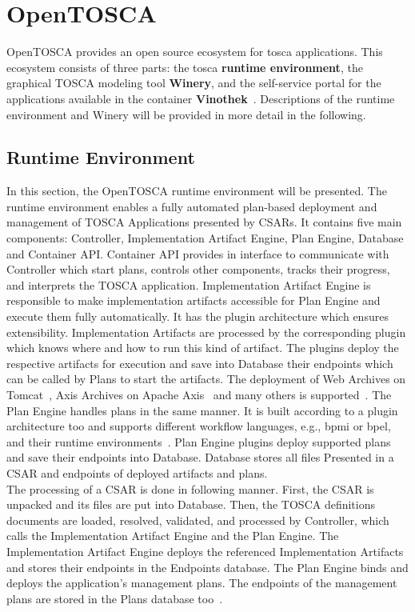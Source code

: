 \section{OpenTOSCA} \label{sec:opentosca}
OpenTOSCA provides an open source ecosystem for \gls{tosca} applications. 
This ecosystem consists of three parts: the \gls{tosca} \textbf{runtime environment}, the graphical TOSCA modeling tool \textbf{Winery}, and the self-service portal for the applications available in the container \textbf{Vinothek}~\cite*{OpenTOSCA}.
Descriptions of the runtime environment and Winery will be provided in more detail in the following. 
\subsection*{Runtime Environment}
In this section, the OpenTOSCA runtime environment will be presented.
The runtime environment enables a fully automated plan-based deployment and management of TOSCA Applications presented by CSARs. 
It contains five main components: Controller, Implementation Artifact Engine, Plan Engine, Database and Container API.
Container API provides in interface to communicate with Controller which  start plans, controls other components, tracks their progress, and interprets the TOSCA application.
Implementation Artifact Engine is responsible to make implementation artifacts accessible for Plan Engine and execute them fully automatically.
It has the plugin architecture which ensures extensibility.
Implementation Artifacts are processed by the corresponding plugin which knows where and how to run this kind of artifact. 
The plugins deploy the respective artifacts for execution and save into Database their endpoints which can be called by Plans to start the artifacts.
The deployment of Web Archives on Tomcat~\cite*{tomcat}, Axis Archives on Apache Axis~\cite*{axis} and many others is supported~\cite*{macharb}.
The Plan Engine handles plans in the same manner.
It is built according to a plugin architecture too and supports different workflow languages, e.g., \gls{bpmi} or \gls{bpel}, and their runtime environments~\cite{INPROC-2013-45}.
Plan Engine plugins deploy supported plans and save their endpoints into Database.
Database stores all files Presented in a CSAR and endpoints of deployed artifacts and plans.
\\
The processing of a CSAR is done in following manner.  
First, the CSAR is unpacked and its files are put into Database.
Then, the TOSCA definitions documents are loaded, resolved, validated, and processed by Controller, which calls the Implementation Artifact Engine and the Plan Engine.
The Implementation Artifact Engine deploys the referenced Implementation Artifacts and stores their endpoints in the Endpoints database. 
The Plan Engine binds and deploys the application’s management plans.
The endpoints of the management plans are stored in the Plans database too~\cite{INPROC-2013-45}.
%
%
